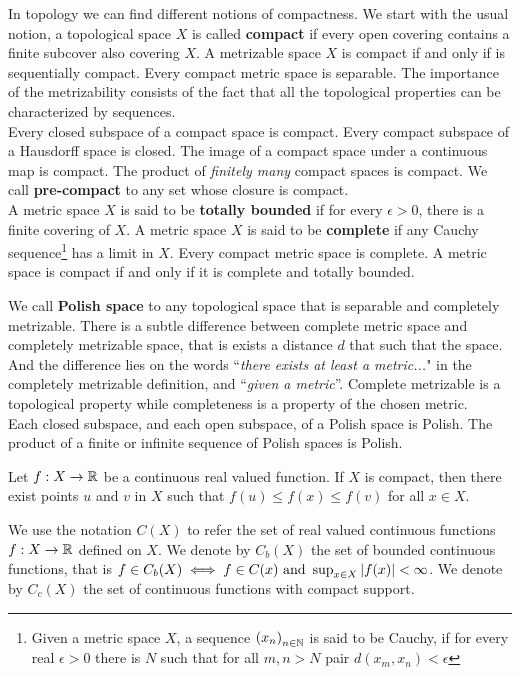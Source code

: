 In topology we can find different notions of compactness. We start with the usual notion, a topological space $X$ is called \textbf{compact} if every open covering contains a finite subcover also covering $X$. A metrizable space $X$ is compact if and only if is sequentially compact. Every compact metric space is separable. The importance of the metrizability consists of the fact that all the topological properties can be characterized by sequences. \\


Every closed subspace of a compact space is compact. Every compact subspace of a Hausdorff space is closed. The image of a compact space under a continuous map is compact. The product of \emph{finitely many} compact spaces is compact. We call \textbf{pre-compact} to any set whose closure is compact. \\

A metric space $X$ is said to be \textbf{totally bounded} if for every $\epsilon>0$, there is a finite covering of $X$. A metric space $X$ is said to be \textbf{complete} if any Cauchy sequence\footnote{Given a metric space $X$, a sequence $\left( x_n \right)_{n\in\mathbb{N}}$ is said to be Cauchy, if for every real $\epsilon>0$ there is $N$ such that for all $m,n>N$ pair $d(x_m, x_n)<\epsilon$} has a limit in $X$. Every compact metric space is complete. 
A metric space is compact if and only if it is complete and totally bounded.

We call \textbf{Polish space} to any topological space that is separable and completely metrizable. There is a subtle difference between complete metric space and completely metrizable space, that is exists a distance $d$ that such that the space.  And the difference lies on the words ``\textit{there exists at least a metric...}" in the completely metrizable definition, and ``\textit{given a metric}''. Complete metrizable is a topological property while completeness is a property of the chosen metric.\\

Each closed subspace, and each open subspace, of a Polish space is Polish. The product of a finite or infinite sequence of Polish spaces is
Polish.

\begin{theorem}
	Let $f:X\rightarrow \mathbb{R}$ be a continuous real valued function. If $X$ is compact, then there exist points $u$ and $v$ in $X$ such that $f(u)\leq f(x)\leq f(v)$ for all $x\in X$.
\end{theorem}
 We use the notation $C(X)$ to refer the set of real valued continuous functions $f:X\rightarrow \mathbb{R}$ defined on $X$. We denote by $C_b(X)$ the set of bounded continuous functions, that is $f\in C_b(X) \iff f\in C(x)\ \mathrm{and}\ \sup_{x\in X} \left| f(x) \right|<\infty$. We denote by $C_c(X)$ the set of continuous functions with compact support. \\
  
